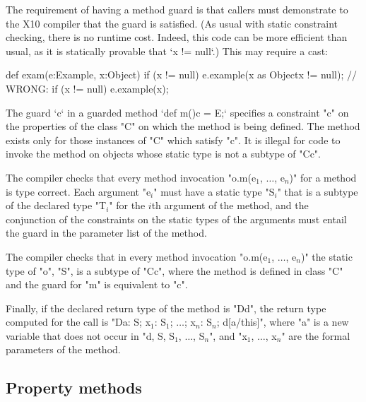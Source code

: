 The requirement of having a method guard is that callers must demonstrate to
the X10
compiler that the guard is satisfied.  (As usual with static constraint
checking, there is no runtime cost.  Indeed, this code can be more efficient
than usual, as it is statically provable that \xcd`x != null`.)
This may require a cast: 
\begin{xten}
  def exam(e:Example, x:Object) {
    if (x != null) 
       e.example(x as Object{x != null});
    // WRONG: if (x != null) e.example(x);
  }
\end{xten}

The guard \xcd`{c}` 
in a guarded method 
\xcd`def m(){c} = E;`
specifies a constraint \xcd"c" on the
properties of the class \xcd"C" on which the method is being defined. The
method exists only for those instances of \xcd"C" which satisfy \xcd"c".  It is
illegal for code to invoke the method on objects whose static type is
not a subtype of \xcd"C{c}".

\begin{staticrule*}
    The compiler checks that every method invocation
    \xcdmath"o.m(e$_1$, $\dots$, e$_n$)"
    for a method is type correct. Each argument
    \xcdmath"e$_i$" must have a
    static type \xcdmath"S$_i$" that is a subtype of the declared type
    \xcdmath"T$_i$" for the $i$th
    argument of the method, and the conjunction of the constraints on the
    static types 
    of the arguments must entail the guard in the parameter list
    of the method.

    The compiler checks that in every method invocation
    \xcdmath"o.m(e$_1$, $\dots$, e$_n$)"
    the static type of \xcd"o", \xcd"S", is a subtype of \xcd"C{c}", where the method
    is defined in class \xcd"C" and the guard for \xcd"m" is equivalent to
    \xcd"c".

    Finally, if the declared return type of the method is
    \xcd"D{d}", the
    return type computed for the call is
    \xcdmath"D{a: S; x$_1$: S$_1$; $\dots$; x$_n$: S$_n$; d[a/this]}",
    where \xcd"a" is a new
    variable that does not occur in
    \xcdmath"d, S, S$_1$, $\dots$, S$_n$", and
    \xcdmath"x$_1$, $\dots$, x$_n$" are the formal
    parameters of the method.
\end{staticrule*}


\subsection{Property methods}

